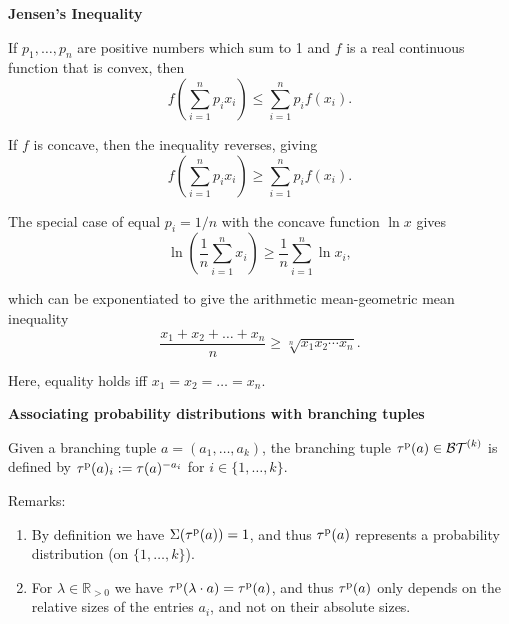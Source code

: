 \documentclass{report}
\def\p{{\rm p}}
\begin{document}
\begin{enumerate}
\begin{enumerate}
				{\bf Jensen's Inequality}
				
				If $p_1,\ldots,p_n$ are positive numbers which sum to 1 and $f$ is a real
				continuous function that is convex, then
				\begin{equation}
				f\left(\sum^n_{i=1}p_ix_i\right) \leq \sum^{n}_{i=1}p_if(x_i).
				\end{equation}
				
				If $f$ is concave, then the inequality reverses, giving
				\begin{equation}
				f\left(\sum^n_{i=1}p_ix_i\right) \geq \sum^{n}_{i=1}p_if(x_i).
				\end{equation}
				
				The special case of equal $p_i=1/n$ with the concave function $\ln x$ gives
				\begin{equation}
				\ln\left(\frac1n\sum^n_{i=1}x_i\right) \geq \frac1n\sum^{n}_{i=1}\ln x_i,
				\end{equation}
				
				
				which can be exponentiated to give the arithmetic mean-geometric mean inequality
				\begin{equation}
				\frac{x_1+x_2+\ldots + x_n}{n}\geq \sqrt[n]{x_1x_2\cdots x_n}.
				\end{equation}
				
				Here, equality holds iff $x_1=x_2=\ldots = x_n$.
				
				
				
				
			\end{enumerate}
			
			{\bf Associating probability distributions with branching tuples}
			
			{ Given a branching tuple $a = (a_1 ,\ldots,a_k )$, the branching tuple
				$\tau^\p (a) \in \mathcal{BT}^{(k)}$ is defined by $\tau^\p (a) _i := \tau (a) ^{-a_i}$ for $i \in \{1,\ldots,k\}$.}
			
			Remarks:
			
			\begin{enumerate}
				\item By definition we have $\Sigma (\tau^\p (a)) = 1$, and thus $\tau^\p (a)$ represents a probability distribution (on $\{1,\ldots,k\}$).
				
				\item  For $\lambda \in {\mathbb{R}}_{>0}$ we have $\tau^\p (\lambda \cdot a) = \tau^\p (a)$, and thus $\tau^\p (a) $ only depends on
				the relative sizes of the entries $a_ i$, and not on their absolute sizes.
				

\end{enumerate}
\end{enumerate}
\end{document}
